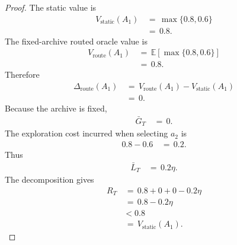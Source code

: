 \documentclass{article} %
\begin{document}
\begin{proof}
The static value is
\begin{align}
\label{eq:app-fourth-hom-proof-static}
V_{\mathrm{static}}(A_1)
&\,=\,
\max\{0.8,0.6\}
\\
&\,=\,
0.8.
\end{align}
The fixed-archive routed oracle value is
\begin{align}
\label{eq:app-fourth-hom-proof-route}
V_{\mathrm{route}}(A_1)
&\,=\,
\mathbb{E}[\max\{0.8,0.6\}]
\\
&\,=\,
0.8.
\end{align}
Therefore
\begin{align}
\label{eq:app-fourth-hom-proof-delta}
\Delta_{\mathrm{route}}(A_1)
&\,=\,
V_{\mathrm{route}}(A_1)-V_{\mathrm{static}}(A_1)
\\
&\,=\,
0.
\end{align}
Because the archive is fixed,
\begin{align}
\label{eq:app-fourth-hom-proof-g}
\bar G_T
&\,=\,
0.
\end{align}
The exploration cost incurred when selecting \(a_2\) is
\begin{align}
\label{eq:app-fourth-hom-proof-tax-per}
0.8-0.6
&\,=\,
0.2.
\end{align}
Thus
\begin{align}
\label{eq:app-fourth-hom-proof-tax}
\bar L_T
&\,=\,
0.2\eta.
\end{align}
The decomposition gives
\begin{align}
\label{eq:app-fourth-hom-proof-r}
R_T
&\,=\,
0.8+0+0-0.2\eta
\\
&\,=\,
0.8-0.2\eta
\\
&<
0.8
\\
&\,=\,
V_{\mathrm{static}}(A_1).
\end{align}
\end{proof}
\end{document}
